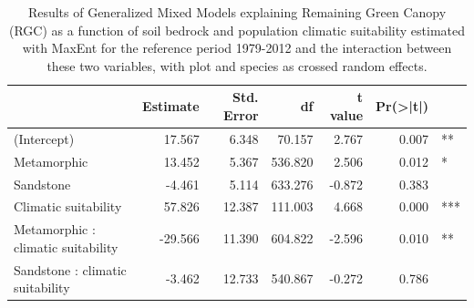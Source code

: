 \documentclass[11pt,twoside]{reedthesis}
\begin{document}
\begin{table}[H]

\caption[Results of Generalized Mixed Models explaining Remaining Green Canopy (RGC) as a function of soil bedrock and population climatic suitability for the reference period 1979-2012]{\label{tab:unnamed-chunk-32}Results of Generalized Mixed Models explaining Remaining Green Canopy (RGC) as a function of soil bedrock and population climatic suitability estimated with MaxEnt for the reference period 1979-2012 and the interaction between these two variables, with plot and species as crossed random effects.}
\centering
\fontsize{7}{9}\selectfont
\begin{tabular}[t]{lrrrrrl}
\toprule
 & Estimate & Std. Error & df & t value & Pr(>|t|) & \\
\midrule
(Intercept) & 17.567 & 6.348 & 70.157 & 2.767 & 0.007 & **\\
Metamorphic & 13.452 & 5.367 & 536.820 & 2.506 & 0.012 & *\\
Sandstone & -4.461 & 5.114 & 633.276 & -0.872 & 0.383 & \\
Climatic suitability & 57.826 & 12.387 & 111.003 & 4.668 & 0.000 & ***\\
Metamorphic : climatic suitability & -29.566 & 11.390 & 604.822 & -2.596 & 0.010 & **\\
Sandstone : climatic suitability & -3.462 & 12.733 & 540.867 & -0.272 & 0.786 & \\
\bottomrule
\end{tabular}
\end{table}
\end{document}
